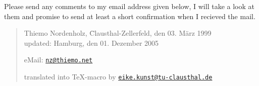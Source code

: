 \documentclass[pagesize=auto, fontsize=12pt, headings=normal]{scrartcl}
\newcommand*{\mail}[1]{\href{mailto:#1}{\texttt{#1}}}
\begin{document}
Please send any comments to my email address given below, I will take a look
at them and promise to send at least a short confirmation when I recieved the 
mail.

\begin{quote}
  \begin{tabbing}
    Thiemo Nordenholz, \= Clausthal-Zellerfeld, den 03. März 1999 \\
    updated:           \> Hamburg, den 01. Dezember 2005
  \end{tabbing}
  eMail: \mail{nz@thiemo.net}

  translated into \TeX-macro by \mail{eike.kunst@tu-clausthal.de}
\end{quote}
\end{document}

